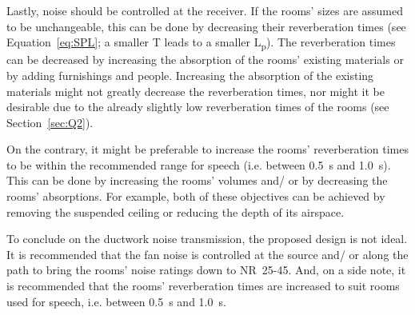 Lastly, noise should be controlled at the receiver.
If the rooms' sizes are assumed to be unchangeable, this can be done by decreasing their reverberation times (see Equation~\ref{eq:SPL}; a smaller T leads to a smaller L\textsubscript{p}).
The reverberation times can be decreased by increasing the absorption of the rooms' existing materials or by adding furnishings and people.
Increasing the absorption of the existing materials might not greatly decrease the reverberation times, nor might it be desirable due to the already slightly low reverberation times of the rooms (see Section~\ref{sec:Q2}).

On the contrary, it might be preferable to increase the rooms' reverberation times to be within the recommended range for speech (i.e. between 0.5~s and 1.0~s).
This can be done by increasing the rooms' volumes and/ or by decreasing the rooms' absorptions.
For example, both of these objectives can be achieved by removing the suspended ceiling or reducing the depth of its airspace.

To conclude on the ductwork noise transmission, the proposed design is not ideal.
It is recommended that the fan noise is controlled at the source and/ or along the path to bring the rooms' noise ratings down to NR~25-45.
And, on a side note, it is recommended that the rooms' reverberation times are increased to suit rooms used for speech, i.e. between 0.5~s and 1.0~s.




